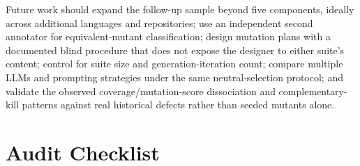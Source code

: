 \documentclass[10pt,conference]{IEEEtran}
\begin{document}
Future work should expand the follow-up sample beyond five components, ideally across additional languages and repositories; use an independent second annotator for equivalent-mutant classification; design mutation plans with a documented blind procedure that does not expose the designer to either suite's content; control for suite size and generation-iteration count; compare multiple LLMs and prompting strategies under the same neutral-selection protocol; and validate the observed coverage/mutation-score dissociation and complementary-kill patterns against real historical defects rather than seeded mutants alone.




\appendices
\section{Audit Checklist}
\label{app:audit}
\end{document}
